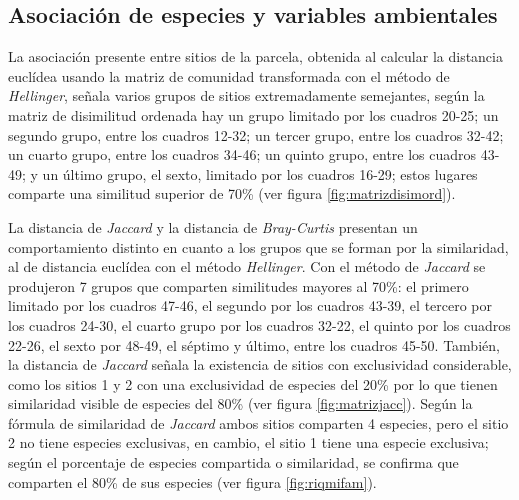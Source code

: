 \documentclass[11pt,]{article}
\begin{document}
\subsection{Asociación de especies y variables
ambientales}\label{asociaciuxf3n-de-especies-y-variables-ambientales}

La asociación presente entre sitios de la parcela, obtenida al calcular
la distancia euclídea usando la matriz de comunidad transformada con el
método de \emph{Hellinger}, señala varios grupos de sitios
extremadamente semejantes, según la matriz de disimilitud ordenada hay
un grupo limitado por los cuadros 20-25; un segundo grupo, entre los
cuadros 12-32; un tercer grupo, entre los cuadros 32-42; un cuarto
grupo, entre los cuadros 34-46; un quinto grupo, entre los cuadros
43-49; y un último grupo, el sexto, limitado por los cuadros 16-29;
estos lugares comparte una similitud superior de 70\% (ver figura
\ref{fig:matrizdisimord}).

La distancia de \emph{Jaccard} y la distancia de \emph{Bray-Curtis}
presentan un comportamiento distinto en cuanto a los grupos que se
forman por la similaridad, al de distancia euclídea con el método
\emph{Hellinger}. Con el método de \emph{Jaccard} se produjeron 7 grupos
que comparten similitudes mayores al 70\%: el primero limitado por los
cuadros 47-46, el segundo por los cuadros 43-39, el tercero por los
cuadros 24-30, el cuarto grupo por los cuadros 32-22, el quinto por los
cuadros 22-26, el sexto por 48-49, el séptimo y último, entre los
cuadros 45-50. También, la distancia de \emph{Jaccard} señala la
existencia de sitios con exclusividad considerable, como los sitios 1 y
2 con una exclusividad de especies del 20\% por lo que tienen
similaridad visible de especies del 80\% (ver figura
\ref{fig:matrizjacc}). Según la fórmula de similaridad de \emph{Jaccard}
ambos sitios comparten 4 especies, pero el sitio 2 no tiene especies
exclusivas, en cambio, el sitio 1 tiene una especie exclusiva; según el
porcentaje de especies compartida o similaridad, se confirma que
comparten el 80\% de sus especies (ver figura \ref{fig:riqmifam}).
\end{document}
